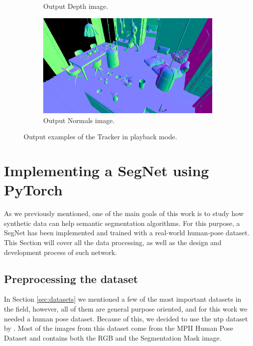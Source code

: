 \begin{figure}[!ht]
\begin{subfigure}[b]{0.475\textwidth}
		\caption[Output Depth image.]%
		{{\small Output Depth image.}}    
		\label{fig:generated_depth}
	\end{subfigure}
	\quad
	\begin{subfigure}[b]{0.475\textwidth}   
		\centering 
		\includegraphics[width=\textwidth]{archivos/generated_normals.png}
		\caption[Output Normals image.]%
		{{\small Output Normals image.}}    
		\label{fig:generated_normals}
	\end{subfigure}
	\caption{Output examples of the Tracker in playback mode.}
	\label{fig:playback_output}
\end{figure}

\section{Implementing a SegNet using PyTorch}
\label{sec:segnet}
As we previously mentioned, one of the main goals of this work is to study how synthetic data can help semantic segmentation algorithms. For this purpose, a SegNet has been implemented and trained with a real-world human-pose dataset. This Section will cover all the data processing, as well as the design and development process of such network.

\subsection{Preprocessing the dataset}
\label{sec:preprocess}
In Section \ref{sec:datasets} we mentioned a few of the most important datasets in the field, however, all of them are general purpose oriented, and for this work we needed a human pose dataset. Because of this, we decided to use the \gls{utp} dataset by \cite{Lassner:UP:2017}. Most of the images from this dataset come from the MPII Human Pose Dataset and contains both the RGB and the Segmentation Mask image.

